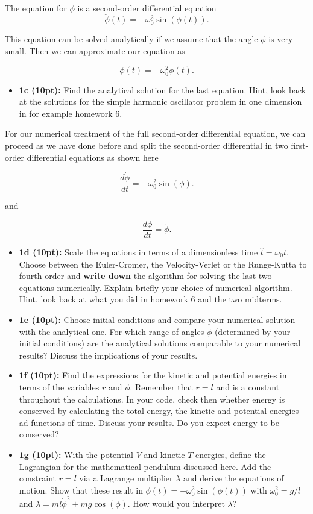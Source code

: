 \documentclass[%
oneside,                 %
final,                   %
10pt]{article}
\begin{document}
\noindent
The equation for $\phi$ is a second-order differential equation
\[
\ddot{\phi}(t)=-\omega_0^2\sin{(\phi(t))}.
\]

This equation can be solved analytically if we assume that the angle $\phi$ is very small. Then we can approximate our equation as

\[
\ddot{\phi}(t)=-\omega_0^2\phi(t).
\]

\begin{itemize}
\item \textbf{1c (10pt):} Find the analytical solution for the last equation. Hint, look back at the solutions for the simple harmonic oscillator problem in one dimension in for example homework 6.
\end{itemize}

\noindent
For our numerical treatment of the full second-order differential  equation, we can proceed as we have done before and split the second-order differential in two first-order differential equations
as shown here

\[
\frac{d\dot{\phi}}{dt}=-\omega_0^2\sin{(\phi)}.
\]

and

\[
\frac{d\phi}{dt}=\dot{\phi}.
\]


\begin{itemize}
\item \textbf{1d (10pt):} Scale the equations in terms of a dimensionless time $\hat{t}=\omega_0t$. Choose between the Euler-Cromer, the Velocity-Verlet or the Runge-Kutta to fourth order and \textbf{write down} the algorithm for solving the last two equations numerically. Explain briefly your choice of numerical algorithm. Hint, look back at what you did in homework 6 and the two midterms.

\item \textbf{1e (10pt):} Choose initial conditions and compare your numerical solution with the analytical one. For which range of angles $\phi$ (determined by your initial conditions) are the analytical solutions comparable to your numerical results? Discuss the implications of your results.

\item \textbf{1f (10pt):} Find the expressions for the kinetic and potential energies in terms of the variables $r$ and $\phi$. Remember that $r=l$ and is a constant throughout the calculations. In your code, check then whether energy is conserved by calculating the total energy, the kinetic and potential energies ad functions of time. Discuss your results. Do you expect energy to be conserved? 

\item \textbf{1g (10pt):} With the potential $V$  and kinetic $T$ energies, define the Lagrangian for the mathematical pendulum discussed here. Add the constraint $r=l$ via a Lagrange multiplier $\lambda$ and derive the equations of motion. Show that these result in  $\ddot{\phi}(t)=-\omega_0^2\sin{(\phi(t))}$ with $\omega_0^2=g/l$ and $\lambda=ml\dot{\phi}^2+mg\cos{(\phi)}$.  How would you interpret $\lambda$? 
\end{itemize}
\end{document}
